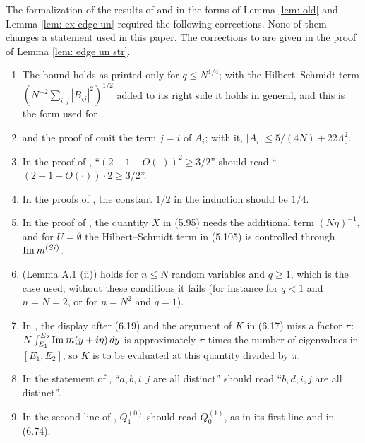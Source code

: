 \begin{rem} \label{rem: corrections}
The formalization of the results of \cite{EKYY1} and \cite{EKYY2} in the forms of Lemma \ref{lem: old} and Lemma \ref{lem: ex edge un} required the following corrections. None of them changes a statement used in this paper. The corrections to \cite{EYY} are given in the proof of Lemma \ref{lem: edge un str}.
\begin{enumerate}
\item The bound \cite[(3.22)]{EKYY1} holds as printed only for $q\le N^{1/4}$; with the Hilbert--Schmidt term $(N^{-2}\sum_{i,j}|B_{ij}|^2)^{1/2}$ added to its right side it holds in general, and this is the form used for \cite[(3.32)]{EKYY1}.
\item \cite[(3.36)]{EKYY1} and the proof of \cite[Lemma 3.15]{EKYY1} omit the term $j=i$ of $A_i$; with it, $|A_i|\le 5/(4N)+22\Lambda_o^2$.
\item In the proof of \cite[Lemma 3.16]{EKYY1}, ``$(2-1-O(\cdot))^2\ge3/2$'' should read ``$(2-1-O(\cdot))\cdot2\ge3/2$''.
\item In the proofs of \cite[Lemmas 5.7 and 5.11]{EKYY1}, the constant $1/2$ in the induction should be $1/4$.
\item In the proof of \cite[Lemma 5.13]{EKYY1}, the quantity $X$ in (5.95) needs the additional term $(N\eta)^{-1}$, and for $U=\emptyset$ the Hilbert--Schmidt term in (5.105) is controlled through $\mathrm{Im}\: m^{(Si)}$.
\item \cite[(A.4)]{EKYY1} (Lemma A.1 (ii)) holds for $n\le N$ random variables and $q\ge1$, which is the case used; without these conditions it fails (for instance for $q<1$ and $n=N=2$, or for $n=N^2$ and $q=1$).
\item In \cite{EKYY2}, the display after (6.19) and the argument of $K$ in (6.17) miss a factor $\pi$: $N\int_{E_1}^{E_2}\mathrm{Im}\: m(y+i\eta)\,dy$ is approximately $\pi$ times the number of eigenvalues in $[E_1,E_2]$, so $K$ is to be evaluated at this quantity divided by $\pi$.
\item In the statement of \cite[Lemma 6.8]{EKYY2}, ``$a,b,i,j$ are all distinct'' should read ``$b,d,i,j$ are all distinct''.
\item In the second line of \cite[(6.75)]{EKYY2}, $Q^{(0)}_1$ should read $Q^{(1)}_0$, as in its first line and in (6.74).
\end{enumerate}
\end{rem}



